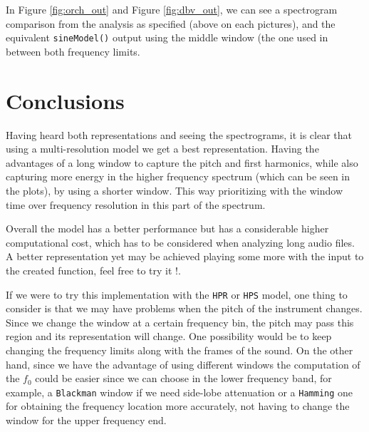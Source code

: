 \documentclass[11pt]{article}
\begin{document}
In Figure \ref{fig:orch_out} and Figure \ref{fig:dbv_out}, we can see a spectrogram comparison from the analysis as specified (above on each pictures), and the equivalent \texttt{sineModel()} output using the middle window (the one used in between both frequency limits.

\section{Conclusions}

Having heard both representations and seeing the spectrograms, it is clear that using a multi-resolution model we get a best representation. Having the advantages of a long window to capture the pitch and first harmonics, while also capturing more energy in the higher frequency spectrum (which can be seen in the plots), by using a shorter window. This way prioritizing with the window time over frequency resolution in this part of the spectrum.

Overall the model has a better performance but has a considerable higher computational cost, which has to be considered when analyzing long audio files. A better representation yet may be achieved playing some more with the input to the created function, feel free to try it !.\vspace{8pt}

If we were to try this implementation with the \texttt{HPR} or \texttt{HPS} model, one thing to consider is that we may have problems when the pitch of the instrument changes. Since we change the window at a certain frequency bin, the pitch may pass this region and its representation will change. One possibility would be to keep changing the frequency limits along with the frames of the sound. On the other hand, since we have the advantage of using different windows the computation of the $f_0$ could be easier since we can choose in the lower frequency band, for example, a \texttt{Blackman} window if we need side-lobe attenuation or a \texttt{Hamming} one for obtaining the frequency location more accurately, not having to change the window for the upper frequency end.
\end{document}
